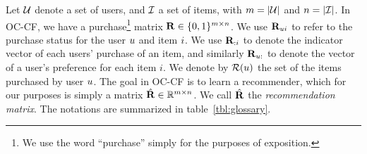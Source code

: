 
Let $\mathcal{U}$ denote a set of users, and $\mathcal{I}$ a set of items,
with $m = | \mathcal{U} |$ and $n = | \mathcal{I} |$.
In OC-CF, we have a purchase\footnote{We use the word ``purchase'' simply for the purposes of exposition.} 
matrix $\mathbf{R} \in \{ 0, 1 \}^{m \times n}$. %
We use $\mathbf{R}_{ui}$ to refer to the purchase status for the user $u$ and item $i$.
We use $\mathbf{R}_{:i}$ to denote the indicator vector of each users' purchase of an item, and similarly $\mathbf{R}_{u:}$ to denote the vector of a user's preference for each item $i$.
We denote by  $\mathcal{R}(u)$ the set of the items purchased by user $u$. The goal in OC-CF is to learn a recommender, which for our purposes is simply a matrix $\hat{\mathbf{R}} \in \mathbb{R}^{m \times n}$. %
We call $\hat{\mathbf{R}}$ the \emph{recommendation matrix}. The notations are summarized in table~\ref{tbl:glossary}. 

\begin{table}[t]
	\centering
	\caption{Commonly used symbols.}
	\label{tbl:glossary}
\end{table}

